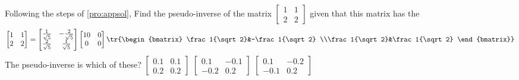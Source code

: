 \begin{activity}
Following the steps of \cref{pro:appsol}, Find the pseudo-inverse of the matrix {\small\(\begin{bmatrix} 1&1\\2&2 \end{bmatrix}\)} given that this matrix has the \svd
\begin{equation*}
\begin{bmatrix} 1&1\\2&2 \end{bmatrix}
=\begin{bmatrix} \frac1{\sqrt5}&-\frac2{\sqrt5}
\\\frac2{\sqrt5}&\frac1{\sqrt5} \end{bmatrix}
\begin{bmatrix} 10&0\\0&0 \end{bmatrix}
\tr{\begin{bmatrix} \frac1{\sqrt2}&-\frac1{\sqrt2}
\\\frac1{\sqrt2}&\frac1{\sqrt2} \end{bmatrix}}
\end{equation*}
The pseudo-inverse is which of these?
{\(\begin{bmatrix} 0.1&0.1\\0.2&0.2 \end{bmatrix}\)}
{\(\begin{bmatrix} 0.1&-0.1\\-0.2&0.2 \end{bmatrix}\)}
{\(\begin{bmatrix} 0.1&-0.2\\-0.1&0.2 \end{bmatrix}\)}
\end{activity}





